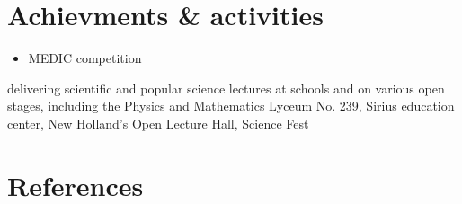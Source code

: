 \documentclass[11pt,a4paper,sans]{moderncv}        %
\begin{document}
\section{Achievments \& activities}

\begin{itemize}
  \item MEDIC competition
\end{itemize}

delivering scientific and popular science lectures at schools and on various open stages, 
including the Physics and Mathematics Lyceum No. 239, Sirius education center, 
New Holland’s Open Lecture Hall, Science Fest

\section{References}








\end{document}
